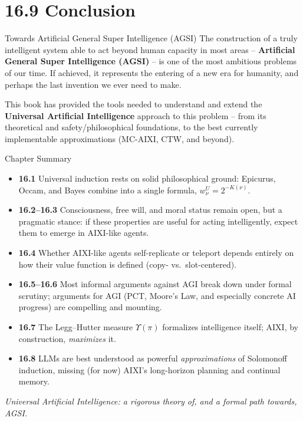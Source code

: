 \documentclass[aspectratio=169,10pt]{beamer}
\begin{document}
\section{16.9 Conclusion}

\begin{frame}{Towards Artificial General Super Intelligence (AGSI)}
  The construction of a truly intelligent system able to act beyond human
  capacity in most areas -- \textbf{Artificial General Super Intelligence
  (AGSI)} -- is one of the most ambitious problems of our time. If achieved,
  it represents the entering of a new era for humanity, and perhaps the
  last invention we ever need to make.

  \vspace{0.4em}
  This book has provided the tools needed to understand and extend the
  \textbf{Universal Artificial Intelligence} approach to this problem --
  from its theoretical and safety/philosophical foundations, to the best
  currently implementable approximations (MC-AIXI, CTW, and beyond).
\end{frame}

\begin{frame}{Chapter Summary}
  \begin{itemize}
    \item \textbf{16.1} Universal induction rests on solid philosophical
      ground: Epicurus, Occam, and Bayes combine into a single formula,
      $w^U_\nu = 2^{-K(\nu)}$.
    \item \textbf{16.2--16.3} Consciousness, free will, and moral status
      remain open, but a pragmatic stance: if these properties are useful
      for acting intelligently, expect them to emerge in AIXI-like agents.
    \item \textbf{16.4} Whether AIXI-like agents self-replicate or teleport
      depends entirely on how their value function is defined (copy- vs.\
      slot-centered).
    \item \textbf{16.5--16.6} Most informal arguments against AGI break
      down under formal scrutiny; arguments for AGI (PCT, Moore's Law, and
      especially concrete AI progress) are compelling and mounting.
    \item \textbf{16.7} The Legg--Hutter measure $\Upsilon(\pi)$ formalizes
      intelligence itself; AIXI, by construction, \emph{maximizes} it.
    \item \textbf{16.8} LLMs are best understood as powerful
      \emph{approximations} of Solomonoff induction, missing (for now)
      AIXI's long-horizon planning and continual memory.
  \end{itemize}
  \vspace{0.3em}
  \begin{center}
    \emph{Universal Artificial Intelligence: a rigorous theory of, and a
    formal path towards, AGSI.}
  \end{center}
\end{frame}
\end{document}
